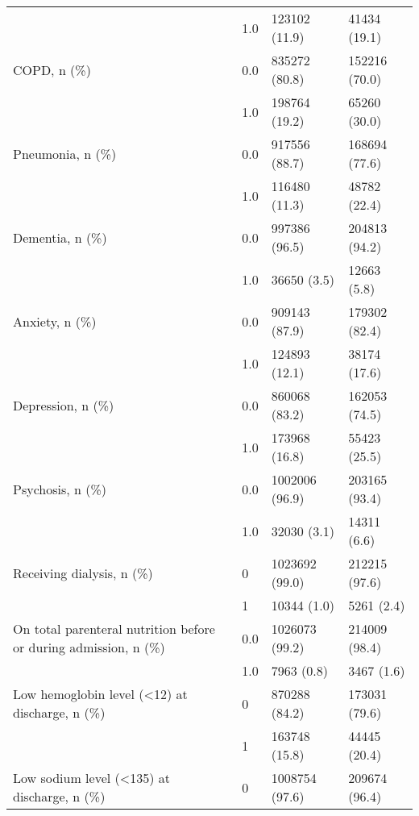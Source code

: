 \begin{tabular}{llll}
                           & 1.0 &                  123102 (11.9) &       41434 (19.1) \\
COPD, n (\%) & 0.0 &                  835272 (80.8) &      152216 (70.0) \\
                           & 1.0 &                  198764 (19.2) &       65260 (30.0) \\
Pneumonia, n (\%) & 0.0 &                  917556 (88.7) &      168694 (77.6) \\
                           & 1.0 &                  116480 (11.3) &       48782 (22.4) \\
Dementia, n (\%) & 0.0 &                  997386 (96.5) &      204813 (94.2) \\
                           & 1.0 &                    36650 (3.5) &        12663 (5.8) \\
Anxiety, n (\%) & 0.0 &                  909143 (87.9) &      179302 (82.4) \\
                           & 1.0 &                  124893 (12.1) &       38174 (17.6) \\
Depression, n (\%) & 0.0 &                  860068 (83.2) &      162053 (74.5) \\
                           & 1.0 &                  173968 (16.8) &       55423 (25.5) \\
Psychosis, n (\%) & 0.0 &                 1002006 (96.9) &      203165 (93.4) \\
                           & 1.0 &                    32030 (3.1) &        14311 (6.6) \\
Receiving dialysis, n (\%) & 0 &                 1023692 (99.0) &      212215 (97.6) \\
                           & 1 &                    10344 (1.0) &         5261 (2.4) \\
On total parenteral nutrition before or during admission, n (\%) & 0.0 &                 1026073 (99.2) &      214009 (98.4) \\
                           & 1.0 &                     7963 (0.8) &         3467 (1.6) \\
Low hemoglobin level (<12) at discharge, n (\%) & 0 &                  870288 (84.2) &      173031 (79.6) \\
                           & 1 &                  163748 (15.8) &       44445 (20.4) \\
Low sodium level (<135) at discharge, n (\%) & 0 &                 1008754 (97.6) &      209674 (96.4) \\

\end{tabular}
